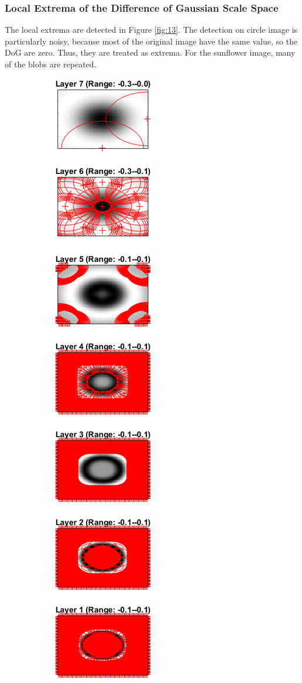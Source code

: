 \subsubsection{Local Extrema of the Difference of Gaussian Scale Space}
The local extrema are detected in Figure \ref{fig:13}.
The detection on circle image is particularly noisy, because most of the original image have the same value, so the DoG are zero.
Thus, they are treated as extrema.
For the sunflower image, many of the blobs are repeated.

\begin{figure}
	\centering
	\begin{subfigure}[t]{0.3\textwidth}
	    \centering
		\includegraphics[height=0.92\textheight]{hw3/problem1/SSXc.png}

\end{subfigure}
\end{figure}
